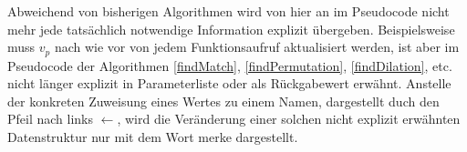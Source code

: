 \begin{algorithm}
\DontPrintSemicolon
\caption{$\Const{findMatch} \colon M \times T \rightarrow \mathit{Bool}$}\label{findMatch}

 {
}
\end{algorithm}

\begin{algorithm}
\DontPrintSemicolon
\caption{$\Const{rematch} \colon M \times T \rightarrow \mathit{Bool}$}\label{rematch}
 {
	 {
	}
	 {
	}
	 {
	}
}        
\end{algorithm}

Abweichend von bisherigen Algorithmen wird von hier an im Pseudocode nicht mehr jede tatsächlich notwendige Information explizit übergeben. Beispielsweise muss $v_p$ nach wie vor von jedem Funktionsaufruf aktualisiert werden, ist aber im Pseudocode der Algorithmen \ref{findMatch}, \ref{findPermutation}, \ref{findDilation}, etc. nicht länger explizit in Parameterliste oder als Rückgabewert erwähnt.
Anstelle der konkreten Zuweisung eines Wertes zu einem Namen, dargestellt duch den Pfeil nach links \glqq $\leftarrow$\grqq{}, wird die Veränderung einer solchen nicht explizit erwähnten Datenstruktur nur mit dem Wort \glqq merke\grqq{} dargestellt.

